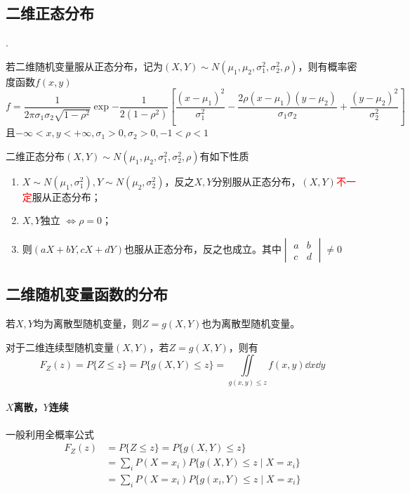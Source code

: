 \subsection{二维正态分布}
.
\begin{definition}
    若二维随机变量服从正态分布，记为$(X,Y)\sim N(\mu_1,\mu_2,\sigma_1^2,\sigma_2^2,\rho)$，则有概率密度函数$f(x,y)$
    \[
        f = \frac{1}{2\pi \sigma_1\sigma_2\sqrt{1-\rho^2}}\exp{-\frac{1}{2(1-\rho^2)}\left[\frac{(x-\mu_1)^2}{\sigma_1^2} - \frac{2\rho(x-\mu_1)(y-\mu_2)}{\sigma_1\sigma_2} + \frac{(y-\mu_2)^2}{\sigma_2^2}\right]}
    \]
    且$-\infty<x,y<+\infty, \sigma_1>0,\sigma_2>0, -1<\rho<1$
\end{definition}

二维正态分布$(X,Y)\sim N(\mu_1,\mu_2,\sigma_1^2,\sigma_2^2,\rho)$有如下性质
\begin{enumerate}[(1)]
    \item $X\sim N(\mu_1,\sigma_1^2), Y\sim N(\mu_2,\sigma_2^2)$，反之$X,Y$分别服从正态分布，$(X,Y)$\textcolor{red}{不一定}服从正态分布；
    \item $X,Y\text{独立~}\iff \rho = 0$；
    \item 则$(aX+bY,cX+dY)$也服从正态分布，反之也成立。其中$\begin{vmatrix}a&b\\c&d\end{vmatrix} \neq 0$
\end{enumerate}

\subsection{二维随机变量函数的分布}
若$X,Y$均为离散型随机变量，则$Z=g(X,Y)$也为离散型随机变量。

对于二维连续型随机变量$(X,Y)$，若$Z=g(X,Y)$，则有
\[ F_Z(z) = P\{Z\leq z\} = P\{ g(X,Y)\leq z\} = \iint\limits_{g(x,y)\leq z} f(x,y)\dd{x}\dd{y} \]

\paragraph{$X$离散，$Y$连续}
一般利用全概率公式
\begin{align*}
    F_Z(z) & = P\{ Z\leq z \} = P\{g(X,Y)\leq z\}            \\
           & =\sum_i P(X=x_i)P\{g(X,Y)\leq z \mid X = x_i\}  \\
           & = \sum_i P(X=x_i)P\{g(x_i, Y)\leq z\mid X=x_i\}
\end{align*}

